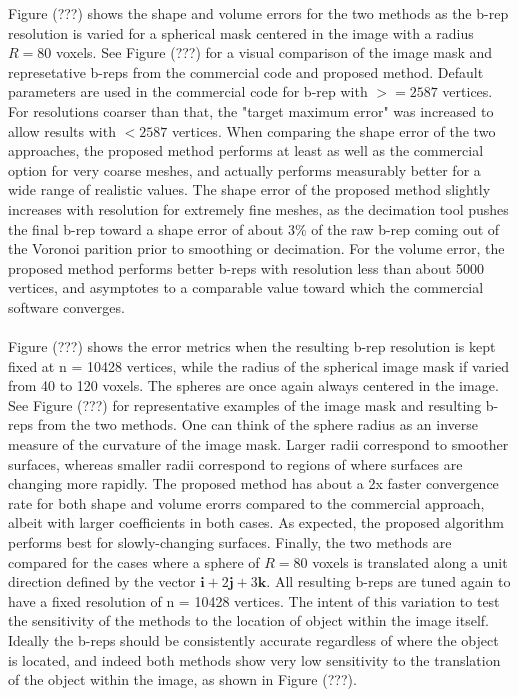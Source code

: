 Figure (???) shows the shape and volume errors for the two methods as the b-rep resolution is varied for a spherical mask centered in the image with a radius $R = 80$ voxels. See Figure (???) for a visual comparison of the image mask and represetative b-reps from the commercial code and proposed method. Default parameters are used in the commercial code for b-rep with $>= 2587$ vertices. For resolutions coarser than that, the "target maximum error" was increased to allow results with $< 2587$ vertices. When comparing the shape error of the two approaches, the proposed method performs at least as well as the commercial option for very coarse meshes, and actually performs measurably better for a wide range of realistic values. The shape error of the proposed method slightly increases with resolution for extremely fine meshes, as the decimation tool pushes the final b-rep toward a shape error of about $3\%$ of the raw b-rep coming out of the Voronoi parition prior to smoothing or decimation. For the volume error, the proposed method performs better b-reps with resolution less than about 5000 vertices, and asymptotes to a comparable value toward which the commercial software converges.\\ \\
%
Figure (???) shows the error metrics when the resulting b-rep resolution is kept fixed at n = 10428 vertices, while the radius of the spherical image mask if varied from 40 to 120 voxels. The spheres are once again always centered in the image. See Figure (???) for representative examples of the image mask and resulting b-reps from the two methods. One can think of the sphere radius as an inverse measure of the curvature of the image mask. Larger radii correspond to smoother surfaces, whereas smaller radii correspond to regions of where surfaces are changing more rapidly. The proposed method has about a 2x faster convergence rate for both shape and volume erorrs compared to the commercial approach, albeit with larger coefficients in both cases. As expected, the proposed algorithm performs best for slowly-changing surfaces.
%
Finally, the two methods are compared for the cases where a sphere of $R = 80$ voxels is translated along a unit direction defined by the vector $\bm{i}  + 2\bm{j} + 3\bm{k}$. All resulting b-reps are tuned again to have a fixed resolution of n = 10428 vertices. The intent of this variation to test the sensitivity of the methods to the location of object within the image itself. Ideally the b-reps should be consistently accurate regardless of where the object is located, and indeed both methods show very low sensitivity to the translation of the object within the image, as shown in Figure (???). \\ \\
